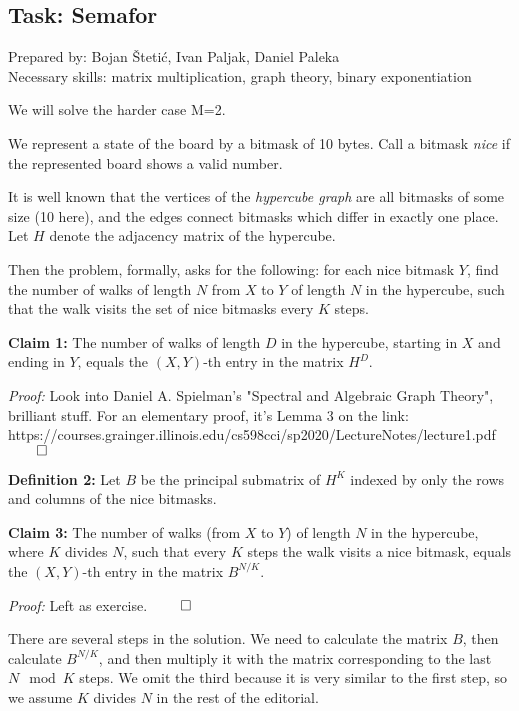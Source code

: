 \subsection*{Task: Semafor}
\textsf{Prepared by: Bojan Štetić, Ivan Paljak, Daniel Paleka}\\
\textsf{Necessary skills: matrix multiplication, graph theory, binary
exponentiation}

We will solve the harder case M=2. 

We represent a state of the board by a bitmask of 10 bytes.
Call a bitmask \textit{nice} if the represented board shows a valid number.

It is well known that the vertices of the \textit{hypercube graph} 
are all bitmasks of some size (10 here), and the edges connect bitmasks
which differ in exactly one place. Let $H$ denote the adjacency matrix
of the hypercube.

Then the problem, formally, asks for the following: for each nice bitmask $Y$, 
find the number of walks of length $N$ from $X$ to $Y$ of length $N$ 
in the hypercube, such that the walk visits the set of nice bitmasks
every $K$ steps.

\textbf{Claim 1:} The number of walks of length $D$ in the hypercube, starting
in $X$ and ending in $Y$, equals the $(X, Y)$-th entry in the matrix $H^D$.

\textit{Proof:} Look into Daniel A. Spielman's "Spectral and Algebraic Graph 
Theory", brilliant stuff. For an elementary proof, it's Lemma 3 on the link: 
\\
{https://courses.grainger.illinois.edu/cs598cci/sp2020/LectureNotes/lecture1.pdf}
$\qed$

\textbf{Definition 2:} Let $B$ be the principal submatrix of $H^K$ indexed by
only the rows and columns of the nice bitmasks.

\textbf{Claim 3:} The number of walks (from $X$ to $Y$) of length $N$ in the
hypercube, where $K$ divides $N$, such that every $K$ steps the walk visits a
nice bitmask, equals the $(X, Y)$-th entry in the matrix $B^{N/K}$.

\textit{Proof:} Left as exercise. $\qed$

There are several steps in the solution. We need to calculate the matrix $B$,
then calculate $B^{N/K}$, and then multiply it with the matrix corresponding
to the last $N \mod K$ steps. We omit the third because it is very similar
to the first step, so we assume $K$ divides $N$ in the rest of the editorial.

